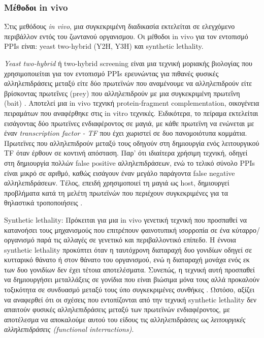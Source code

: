 \subsubsection{Μέθοδοι in vivo}

Στις μεθόδους \textit{in vivo}, μια συγκεκριμένη διαδικασία εκτελείται σε ελεγχόμενο περιβάλλον εντός του ζωντανού οργανισμου. Οι μέθοδοι in vivo για τον εντοπισμό PPIs είναι: yeast two-hybrid (Y2H, Y3H) και synthetic lethality.

\textit{Yeast two-hybrid} ή two-hybrid screening είναι μια τεχνική μοριακής βιολογίας που χρησιμοποιείται για τον εντοπισμό PPIs ερευνώντας για πιθανές φυσικές αλληλεπιδράσεις μεταξύ είτε δύο πρωτεϊνών που αναμένουμε να αλληλεπιδρούν είτε βρίσκοντας πρωτεΐνες (prey) που αλληλεπιδρούν με μια συγκεκριμένη πρωτεΐνη (bait) \cite{Uetz2000}. Αποτελεί μια in vivo τεχνική protein-fragment complementation, οικογένεια πειραμάτων που αναφέρθηκε στις in vitro τεχνικές. Ειδικότερα, το πείραμα εκτελείται εισάγοντας δύο πρωτεϊνες ενδιαφέροντος σε μαγιά, με κάθε πρωτεϊνη να ενώνεται με έναν \textit{transcription factor - TF} που έχει χωριστεί σε δυο πανομοιότυπα κομμάτια. Πρωτεϊνες που αλληλεπιδρούν μεταξύ τους οδηγούν στη δημιουργία ενός λειτουργικού TF όταν έρθουν σε κοντινή απόσταση. Παρ' ότι ιδιαίτερα χρήσιμη τεχνική, οδηγεί στη δημιουργία πολλών false positive αλληλεπιδράσεων, ενώ το τελικό σύνολο PPIs είναι μικρό σε αριθμό, καθώς εισάγουν έναν μεγάλο παράγοντα false negative αλληλεπιδράσεων. Τέλος, επειδή χρησιμοποιεί τη μαγιά ως host, δημιουργεί προβλήματα κατά τη μελέτη πρωτεϊνών που περιέχουν συγκεκριμένες για τα θηλαστικά τροποποιήσεις \cite{Schneider2016}. 

Synthetic lethality: Πρόκειται για μια in vivo γενετική τεχνική που προσπαθεί να κατανοήσει τους μηχανισμούς που επιτρέπουν φαινοτυπική ισορροπία σε ένα κύταρρο/ οργανισμό παρά τις αλλαγές σε γενετικό και περιβαλλοντικό επίπεδο. Η έννοια synthetic lethality προκύπτει όταν η ταυτόχρονη διαταραχή δυο γονιδίων οδηγεί σε κυτταρικό θάνατο ή στον θάνατο του οργανισμού, ενώ η διαταραχή μονάχα ενός εκ των δυο γονιδίων δεν έχει τέτοια αποτελέσματα. Συνεπώς, η τεχνική αυτή προσπαθεί να δημιουργήσει μεταλλάξεις σε γονίδια που είναι βιώσιμα μόνα τους αλλά προκαλούν τοξικότητα σε συνδυασμό μεταξύ τους ύπο συγκεκριμένες συνθήκες \cite{Ooi2006}. Ωστόσο, αξίζει να αναφερθεί ότι οι σχέσεις που εντοπίζονται από την τεχνική synthetic lethality δεν απαιτούν φυσικές αλληλεπιδράσεις μεταξύ των πρωτεϊνών ενδιαφέροντος, με αποτέλεσμα να αποκαλούμε αυτού του είδους τις αλληλεπιδράσεις ως \textit{λειτουργικές αλληλεπιδράσεις (functional interractions)}.

